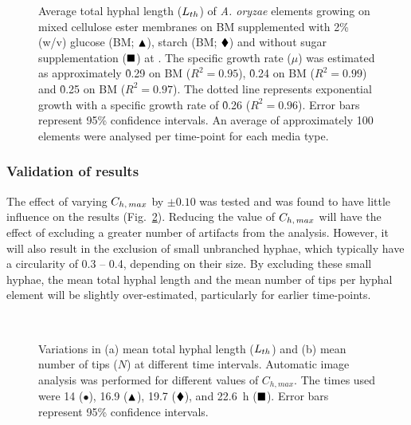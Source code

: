 \begin{figure}[t]
	\centering
	\caption{Average total hyphal length ($L_{th}$) of \emph{A. oryzae} elements growing on mixed cellulose ester membranes on BM supplemented with 2\% (w/v) glucose (BM; $\blacktriangle$), starch (BM; $\blacklozenge$) and without sugar supplementation ($\blacksquare$) at . The specific growth rate ($\mu$) was estimated as approximately \h{0.29} on BM ($R^2=0.95$), \h{0.24} on BM ($R^2=0.99$) and \h{0.25} on BM ($R^2=0.97$). The dotted line represents exponential growth with a specific growth rate of \h{0.26} ($R^2=0.96$). Error bars represent 95\% confidence intervals. An average of approximately 100 elements were analysed per time-point for each media type.}
	\label{fig:TAThlT}
\end{figure}

\subsubsection{Validation of results}

The effect of varying $C_{h,\,max}$ by $\pm 0.10$ was tested and was found to have little influence on the results (Fig.~\ref{fig:ThlNtChmax}). Reducing the value of $C_{h,\,max}$ will have the effect of excluding a greater number of artifacts from the analysis. However, it will also result in the exclusion of small unbranched hyphae, which typically have a circularity of 0.3 -- 0.4, depending on their size. By excluding these small hyphae, the mean total hyphal length and the mean number of tips per hyphal element will be slightly over-estimated, particularly for earlier time-points.

\begin{figure}[htbp]
	\centering
	\captionsetup[subfloat]{position=top}
	\\
  \caption{Variations in (a) mean total hyphal length ($L_{th}$) and (b) mean number of tips ($N$) at different time intervals. Automatic image analysis was performed for different values of $C_{h,max}$. The times used were 14 ($\bullet$), 16.9 ($\blacktriangle$), 19.7 ($\blacklozenge$), and 22.6~h ($\blacksquare$). Error bars represent 95\% confidence intervals.}
  \label{fig:ThlNtChmax}
\end{figure}

